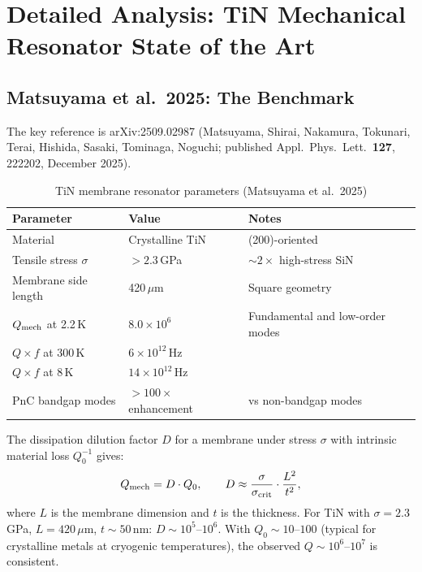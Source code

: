 \documentclass[11pt]{article}
\theoremstyle{remark}
\newcommand{\ee}[1]{\times 10^{#1}}
\begin{document}
\section{Detailed Analysis: TiN Mechanical Resonator State of the Art}
\label{sec:mech}

\subsection{Matsuyama et al.\ 2025: The Benchmark}

The key reference is arXiv:2509.02987 (Matsuyama, Shirai, Nakamura,
Tokunari, Terai, Hishida, Sasaki, Tominaga, Noguchi; published
Appl.\ Phys.\ Lett.\ \textbf{127}, 222202, December 2025).

\begin{table}[H]
\centering
\caption{TiN membrane resonator parameters (Matsuyama et al.\ 2025)}
\begin{tabular}{@{}lll@{}}
\toprule
Parameter & Value & Notes \\
\midrule
Material & Crystalline TiN & (200)-oriented \\
Tensile stress $\sigma$ & $> 2.3$\,GPa & $\sim 2\times$ high-stress SiN \\
Membrane side length & 420\,$\mu$m & Square geometry \\
$Q_{\rm mech}$ at 2.2\,K & $8.0\ee{6}$ & Fundamental and low-order modes \\
$Q \times f$ at 300\,K & $6\ee{12}$\,Hz & \\
$Q \times f$ at 8\,K & $14\ee{12}$\,Hz & \\
PnC bandgap modes & $> 100\times$ enhancement & vs non-bandgap modes \\
\bottomrule
\end{tabular}
\end{table}

The dissipation dilution factor $D$ for a membrane under stress $\sigma$
with intrinsic material loss $Q_0^{-1}$ gives:
\begin{equation}
  Q_{\rm mech} = D \cdot Q_0, \qquad
  D \approx \frac{\sigma}{\sigma_{\rm crit}} \cdot \frac{L^2}{t^2},
\end{equation}
where $L$ is the membrane dimension and $t$ is the thickness.
For TiN with $\sigma = 2.3$\,GPa, $L = 420\,\mu$m, $t \sim 50$\,nm:
$D \sim 10^5$--$10^6$. With $Q_0 \sim 10$--$100$ (typical for
crystalline metals at cryogenic temperatures), the observed
$Q \sim 10^6$--$10^7$ is consistent.
\end{document}

